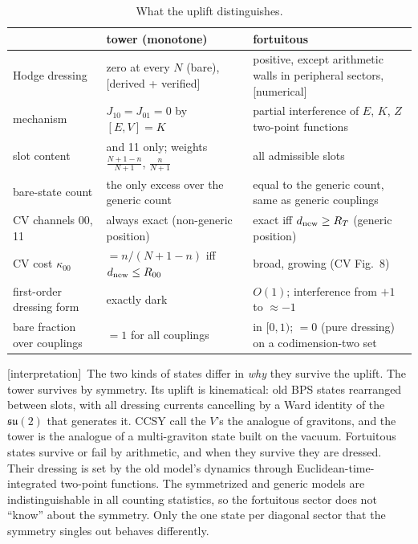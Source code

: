 \documentclass[11pt]{article}
\newcommand{\dnew}{d_{\rm new}}
\newcommand{\tagbox}[2]{\textsf{\small\color{#1}[#2]}}
\newcommand{\VER}{\tagbox{cder}{derived + verified}}
\newcommand{\NUM}{\tagbox{cnum}{numerical}}
\newcommand{\INTERP}{\tagbox{cconj}{interpretation}}
\theoremstyle{plain}
\theoremstyle{remark}
\numberwithin{equation}{section}
\begin{document}
\begin{table}[ht]
\centering\small
\caption{What the uplift distinguishes.}\label{tab:mf}
\begin{tabular}{@{}>{\raggedright\arraybackslash}p{}>{\raggedright\arraybackslash}p{}>{\raggedright\arraybackslash}p{}@{}}\toprule
 & tower (monotone) & fortuitous\\\midrule
Hodge dressing & zero at every $N$ (bare), \VER & positive, except arithmetic walls in peripheral sectors, \NUM\\
mechanism & $J_{10}=J_{01}=0$ by $[E,V]=K$ & partial interference of $E$, $K$, $Z$ two-point functions\\
slot content & 00 and 11 only; weights $\frac{N+1-n}{N+1}$, $\frac{n}{N+1}$ & all admissible slots\\
bare-state count & the only excess over the generic count & equal to the generic count, same as generic couplings\\
CV channels 00, 11 & always exact (non-generic position) & exact iff $\dnew\ge R_T$ (generic position)\\
CV cost $\kappa_{00}$ & $=n/(N+1-n)$ iff $\dnew\le R_{00}$ & broad, growing (CV Fig.~8)\\
first-order dressing form & exactly dark & $O(1)$; interference from $+1$ to $\approx-1$\\
bare fraction over couplings & $=1$ for all couplings & in $[0,1)$; $=0$ (pure dressing) on a codimension-two set\\\bottomrule
\end{tabular}
\end{table}

\INTERP\ The two kinds of states differ in \emph{why} they survive the uplift. The tower survives by symmetry. Its uplift
is kinematical: old BPS states rearranged between slots, with all dressing currents cancelling by a Ward identity of the
$\mathfrak{su}(2)$ that generates it. CCSY call the $V$'s the analogue of gravitons, and the tower is the analogue of a
multi-graviton state built on the vacuum. Fortuitous states survive or fail by arithmetic, and when they survive they are
dressed. Their dressing is set by the old model's dynamics through Euclidean-time-integrated two-point functions. The
symmetrized and generic models are indistinguishable in all counting statistics, so the fortuitous sector does not ``know''
about the symmetry. Only the one state per diagonal sector that the symmetry singles out behaves differently.
\end{document}
